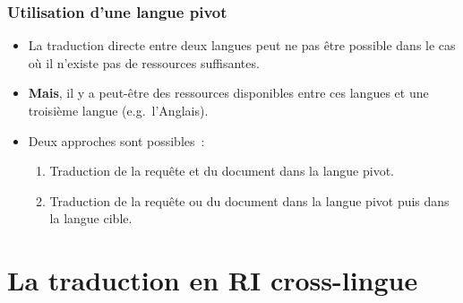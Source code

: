 \documentclass[12pt,aspectratio=43,dvipsnames,table]{beamer}
\begin{document}
\begin{frame}
    \frametitle{Utilisation d'une langue pivot}
    \begin{itemize} \itemsep10pt
        \item La traduction directe entre deux langues peut ne pas être possible
              dans le cas où il n'existe pas de ressources suffisantes.
        \item \textbf{Mais}, il y a peut-être des ressources disponibles entre 
              ces langues et une troisième langue (e.g.~l'Anglais).
        \item Deux approches sont possibles~:
        \begin{enumerate}
            \item Traduction de la requête et du document dans la langue pivot.
            \item Traduction de la requête ou du document dans la langue pivot 
                  puis dans la langue cible.
        \end{enumerate}
    \end{itemize}
\end{frame}


\section{La traduction en RI cross-lingue}
\end{document}
